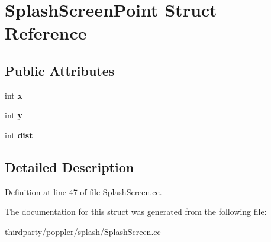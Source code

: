 \hypertarget{struct_splash_screen_point}{}\section{Splash\+Screen\+Point Struct Reference}
\label{struct_splash_screen_point}
\subsection*{Public Attributes}
\begin{DoxyCompactItemize}
\item 
\mbox{\label{struct_splash_screen_point_ab59de30e6e54e7817c3661a320b8d054}} 
int {\bfseries x}
\item 
\mbox{\label{struct_splash_screen_point_af1525fda1d681d8f6738e33d2e41c38a}} 
int {\bfseries y}
\item 
\mbox{\label{struct_splash_screen_point_acbe74f954c879852c7547c5e17c87c77}} 
int {\bfseries dist}
\end{DoxyCompactItemize}


\subsection{Detailed Description}


Definition at line 47 of file Splash\+Screen.\+cc.



The documentation for this struct was generated from the following file\+:\begin{DoxyCompactItemize}
\item 
thirdparty/poppler/splash/Splash\+Screen.\+cc\end{DoxyCompactItemize}
